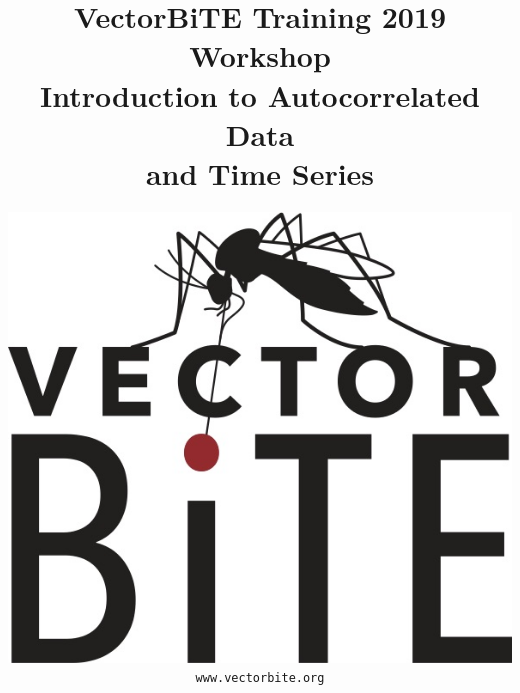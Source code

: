 \documentclass[12pt,xcolor=svgnames]{beamer}
\newcommand{\rd}{\color{red}}
\newcommand{\org}{\color{Orange}}
\newcommand{\gr}{\color{gray}}
\newcommand{\theme}{\color{FireBrick}}
\begin{document}
{ \usebackgroundtemplate{}%
\thispagestyle{empty}
\setcounter{page}{0}

\title{\theme \Large \vskip 0.5cm
{\bf VectorBiTE Training 2019 \\ Workshop}\\
\bigskip
\bf {\sf \gr Introduction to Autocorrelated Data \\ and Time Series}}

\author{
\begin{center}
\includegraphics[scale=0.05,trim=10 10 0 150]{VB_logo.jpg}
\end{center}
\texttt{\rd\small www.vectorbite.org}
}
\date{}
\maketitle 
}





\end{document}
